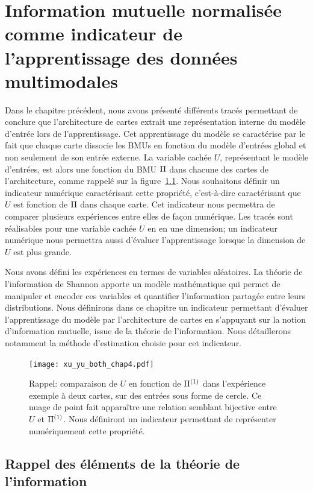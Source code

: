 \chapter{Information mutuelle normalisée comme indicateur de l'apprentissage des données multimodales\label{chap:indicateur}}
\graphicspath{{05-Indicateur/}}
\minitoc

Dans le chapitre précédent, nous avons présenté différents tracés permettant de conclure que l'architecture de cartes extrait une représentation interne du modèle d'entrée lors de l'apprentissage.
Cet apprentissage du modèle se caractérise par le fait que chaque carte dissocie les BMUs en fonction du modèle d'entrées global et non seulement de son entrée externe. 
La variable cachée $U$, représentant le modèle d'entrées, est alors une fonction du BMU $\Pi$ dans chacune des cartes de l'architecture, comme rappelé sur la figure~\ref{fig:upi_chap4}.
Nous souhaitons définir un indicateur numérique caractérisant cette propriété, c'est-à-dire caractérisant que $U$ est fonction de $\Pi$ dans chaque carte. Cet indicateur nous permettra  de comparer plusieurs expériences entre elles de façon numérique.
Les tracés sont réalisables pour une variable cachée $U$ en en une dimension; un indicateur numérique nous permettra aussi d'évaluer l'apprentissage lorsque la dimension de $U$ est plus grande.

Nous avons défini les expériences en termes de variables aléatoires. La théorie de l'information de Shannon \cite{Shannon1948AMT} apporte un modèle mathématique qui permet de manipuler et encoder ces variables et quantifier l'information partagée entre leurs distributions.
Nous définirons dans ce chapitre un indicateur permettant d'évaluer l'apprentissage du modèle par l'architecture de cartes en s'appuyant sur la notion d'information mutuelle, issue de la théorie de l'information.
Nous détaillerons notamment la méthode d'estimation choisie pour cet indicateur.

\begin{figure}
    \centering
    \texttt{[image: xu\_yu\_both\_chap4.pdf]}
    \caption{Rappel: comparaison de $U$ en fonction de $\Pi^{({1})}$ dans l'expérience exemple à deux cartes, sur des entrées sous forme de cercle. Ce nuage de point fait apparaître une relation semblant bijective entre $U$ et $\Pi^{({1})}$. Nous définiront un indicateur permettant de représenter numériquement cette propriété.
    \label{fig:upi_chap4}}
\end{figure}

\section{Rappel des éléments de la théorie de l'information}

